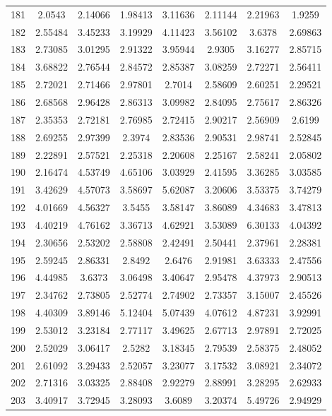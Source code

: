 \begin{center}
\begin{longtable}{cccccccc}
181 & 2.0543 & 2.14066 & 1.98413 & 3.11636 & 2.11144 & 2.21963 & 1.9259\\
182 & 2.55484 & 3.45233 & 3.19929 & 4.11423 & 3.56102 & 3.6378 & 2.69863\\
183 & 2.73085 & 3.01295 & 2.91322 & 3.95944 & 2.9305 & 3.16277 & 2.85715\\
184 & 3.68822 & 2.76544 & 2.84572 & 2.85387 & 3.08259 & 2.72271 & 2.56411\\
185 & 2.72021 & 2.71466 & 2.97801 & 2.7014 & 2.58609 & 2.60251 & 2.29521\\
186 & 2.68568 & 2.96428 & 2.86313 & 3.09982 & 2.84095 & 2.75617 & 2.86326\\
187 & 2.35353 & 2.72181 & 2.76985 & 2.72415 & 2.90217 & 2.56909 & 2.6199\\
188 & 2.69255 & 2.97399 & 2.3974 & 2.83536 & 2.90531 & 2.98741 & 2.52845\\
189 & 2.22891 & 2.57521 & 2.25318 & 2.20608 & 2.25167 & 2.58241 & 2.05802\\
190 & 2.16474 & 4.53749 & 4.65106 & 3.03929 & 2.41595 & 3.36285 & 3.03585\\
191 & 3.42629 & 4.57073 & 3.58697 & 5.62087 & 3.20606 & 3.53375 & 3.74279\\
192 & 4.01669 & 4.56327 & 3.5455 & 3.58147 & 3.86089 & 4.34683 & 3.47813\\
193 & 4.40219 & 4.76162 & 3.36713 & 4.62921 & 3.53089 & 6.30133 & 4.04392\\
194 & 2.30656 & 2.53202 & 2.58808 & 2.42491 & 2.50441 & 2.37961 & 2.28381\\
195 & 2.59245 & 2.86331 & 2.8492 & 2.6476 & 2.91981 & 3.63333 & 2.47556\\
196 & 4.44985 & 3.6373 & 3.06498 & 3.40647 & 2.95478 & 4.37973 & 2.90513\\
197 & 2.34762 & 2.73805 & 2.52774 & 2.74902 & 2.73357 & 3.15007 & 2.45526\\
198 & 4.40309 & 3.89146 & 5.12404 & 5.07439 & 4.07612 & 4.87231 & 3.92991\\
199 & 2.53012 & 3.23184 & 2.77117 & 3.49625 & 2.67713 & 2.97891 & 2.72025\\
200 & 2.52029 & 3.06417 & 2.5282 & 3.18345 & 2.79539 & 2.58375 & 2.48052\\
201 & 2.61092 & 3.29433 & 2.52057 & 3.23077 & 3.17532 & 3.08921 & 2.34072\\
202 & 2.71316 & 3.03325 & 2.88408 & 2.92279 & 2.88991 & 3.28295 & 2.62933\\
203 & 3.40917 & 3.72945 & 3.28093 & 3.6089 & 3.20374 & 5.49726 & 2.94929\\

\end{longtable}
\end{center}

